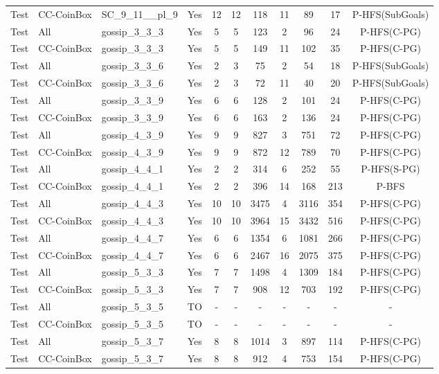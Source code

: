 \documentclass{article}
\begin{document}
\begin{tabular}{lllcccccccc}
Test & CC-CoinBox & SC\_9\_11\_\_pl\_9 & Yes & 12 & 12 & 118 & 11 & 89 & 17 & P-HFS(SubGoals) \\
Test & All & gossip\_3\_3\_3 & Yes & 5 & 5 & 123 & 2 & 96 & 24 & P-HFS(C-PG) \\
Test & CC-CoinBox & gossip\_3\_3\_3 & Yes & 5 & 5 & 149 & 11 & 102 & 35 & P-HFS(C-PG) \\
Test & All & gossip\_3\_3\_6 & Yes & 2 & 3 & 75 & 2 & 54 & 18 & P-HFS(SubGoals) \\
Test & CC-CoinBox & gossip\_3\_3\_6 & Yes & 2 & 3 & 72 & 11 & 40 & 20 & P-HFS(SubGoals) \\
Test & All & gossip\_3\_3\_9 & Yes & 6 & 6 & 128 & 2 & 101 & 24 & P-HFS(C-PG) \\
Test & CC-CoinBox & gossip\_3\_3\_9 & Yes & 6 & 6 & 163 & 2 & 136 & 24 & P-HFS(C-PG) \\
Test & All & gossip\_4\_3\_9 & Yes & 9 & 9 & 827 & 3 & 751 & 72 & P-HFS(C-PG) \\
Test & CC-CoinBox & gossip\_4\_3\_9 & Yes & 9 & 9 & 872 & 12 & 789 & 70 & P-HFS(C-PG) \\
Test & All & gossip\_4\_4\_1 & Yes & 2 & 2 & 314 & 6 & 252 & 55 & P-HFS(S-PG) \\
Test & CC-CoinBox & gossip\_4\_4\_1 & Yes & 2 & 2 & 396 & 14 & 168 & 213 & P-BFS \\
Test & All & gossip\_4\_4\_3 & Yes & 10 & 10 & 3475 & 4 & 3116 & 354 & P-HFS(C-PG) \\
Test & CC-CoinBox & gossip\_4\_4\_3 & Yes & 10 & 10 & 3964 & 15 & 3432 & 516 & P-HFS(C-PG) \\
Test & All & gossip\_4\_4\_7 & Yes & 6 & 6 & 1354 & 6 & 1081 & 266 & P-HFS(C-PG) \\
Test & CC-CoinBox & gossip\_4\_4\_7 & Yes & 6 & 6 & 2467 & 16 & 2075 & 375 & P-HFS(C-PG) \\
Test & All & gossip\_5\_3\_3 & Yes & 7 & 7 & 1498 & 4 & 1309 & 184 & P-HFS(C-PG) \\
Test & CC-CoinBox & gossip\_5\_3\_3 & Yes & 7 & 7 & 908 & 12 & 703 & 192 & P-HFS(C-PG) \\
Test & All & gossip\_5\_3\_5 & TO & - & - & - & - & - & - & - \\
Test & CC-CoinBox & gossip\_5\_3\_5 & TO & - & - & - & - & - & - & - \\
Test & All & gossip\_5\_3\_7 & Yes & 8 & 8 & 1014 & 3 & 897 & 114 & P-HFS(C-PG) \\
Test & CC-CoinBox & gossip\_5\_3\_7 & Yes & 8 & 8 & 912 & 4 & 753 & 154 & P-HFS(C-PG) \\

\end{tabular}
\end{document}
